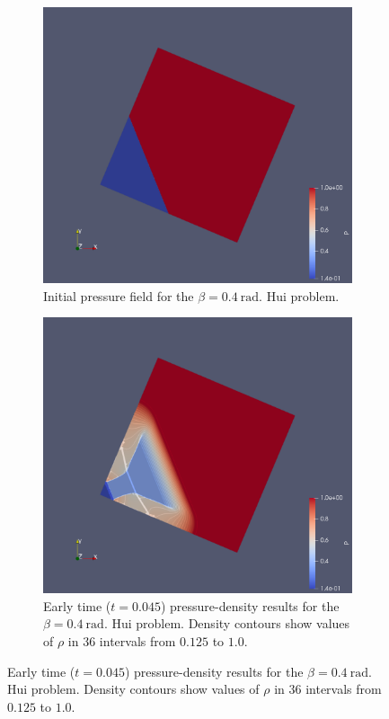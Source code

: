 \begin{figure}[h!]
\centering
\begin{subfigure}[h!]{0.4\linewidth}
\centering
\includegraphics[scale=0.16]{figures/GAH-Hui-400-0000-R.pdf }
\caption{Initial pressure field for the $\beta = 0.4 \ \mathrm{rad.}$ Hui problem.\bigskip \bigskip}
  \label{fig:hui-Rot-0}
\end{subfigure}
\begin{subfigure}[h!]{0.4\linewidth}
\centering
\includegraphics[scale=0.16]{figures/GAH-Hui-400-0045-R.pdf }
\caption{Early time ($t = 0.045$) pressure-density results for the $\beta = 0.4 \ \mathrm{rad.}$ Hui problem. Density contours show values of $\rho$ in $36$ intervals from $0.125$ to $1.0$.}
  \label{fig:hui-Rot-0045}
\end{subfigure}


\end{figure}
